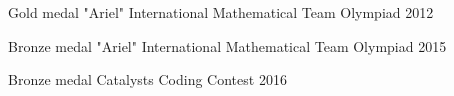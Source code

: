 



\begin{cvhonors}

  \cvhonor
    {Gold medal} %
    {"Ariel" International Mathematical Team Olympiad} %
    {} %
    {2012} %

  \cvhonor
    {Bronze medal} %
    {"Ariel" International Mathematical Team Olympiad} %
    {} %
    {2015} %
    
  \cvhonor
    {Bronze medal} %
    {Catalysts Coding Contest} %
    {} %
    {2016} %


\end{cvhonors}
